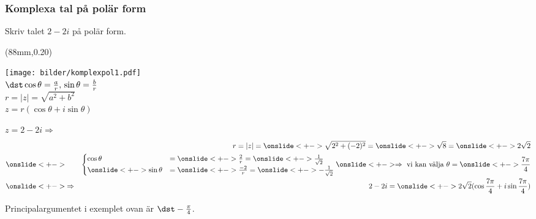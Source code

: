 \documentclass[slidestop,blue,handout,9pt]{beamer}
\begin{document}
\begin{frame}
\frametitle{Komplexa tal på polär form}
\begin{exempel}
Skriv talet $2 - 2i$ på polär form.
\onslide<+->
\begin{textblock*}{31mm}(88mm,0.20\textheight)
\begin{block}{}
\texttt{[image: bilder/komplexpol1.pdf]}\\
\footnotesize
\hspace{0.5cm}
$\dst \cos \theta = \frac{a}{r}, \, 
\sin \theta = \frac{b}{r}$\\
\vspace{0.1cm}
\hspace{0.5cm}
$r = |z| = \sqrt{a^2 + b^2}$\\
\vspace{0.1cm}
\hspace{0.5cm}
$z=r(\cos \theta + i \sin \theta)$
\end{block}
\end{textblock*}    

\begin{minipage}[t]{0.6\linewidth}
\begin{losning}
$z = 2 - 2i\Rightarrow$
\onslide<+->
\begin{eqnarray*}
&&r = |z| = \onslide<+-> \sqrt{2^2 + (-2)^2} = \onslide<+->\sqrt{8} = \onslide<+->2\sqrt{2} \\
\onslide<+->
&&\begin{cases}
\cos \theta &= \onslide<+-> \frac{2}{r} = \onslide<+-> \frac{1}{\sqrt{2}} \\
\onslide<+->
\sin \theta &= \onslide<+-> \frac{-2}{r} = \onslide<+-> -\frac{1}{\sqrt{2}}  
\end{cases}
\onslide<+->
\Rightarrow \text{ vi kan välja } \theta = \onslide<+-> \frac{7\pi}{4} \\
\onslide<+->
&\Rightarrow& 2 - 2i = \onslide<+-> 2\sqrt{2}(\cos\frac{7\pi}{4} + i\sin\frac{7\pi}{4})
\end{eqnarray*}
\end{losning}
\end{minipage}
\end{exempel} 
\begin{anm}
Principalargumentet i exemplet ovan är $\dst -\frac{\pi}{4}$.  
\end{anm}
\end{frame}
\end{document}
